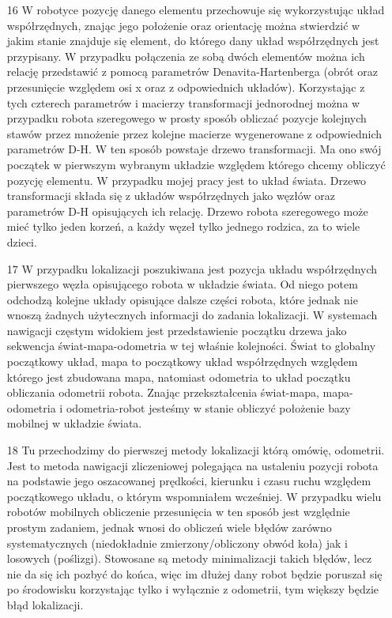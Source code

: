 \documentclass[10pt,a4paper]{article}
\begin{document}
\begin{itemize}
		\item[16]
	W robotyce pozycję danego elementu przechowuje się wykorzystując układ współrzędnych, znając jego położenie oraz orientację można stwierdzić w jakim stanie znajduje się element, do którego dany układ współrzędnych jest przypisany.
W przypadku połączenia ze sobą dwóch elementów można ich relację przedstawić z pomocą parametrów Denavita-Hartenberga (obrót oraz przesunięcie względem osi x oraz z odpowiednich układów). 
Korzystając z tych czterech parametrów i macierzy transformacji jednorodnej można w przypadku robota szeregowego w prosty sposób obliczać pozycje kolejnych stawów przez mnożenie przez kolejne macierze wygenerowane z odpowiednich parametrów D-H.
W ten sposób powstaje drzewo transformacji. Ma ono swój początek w pierwszym wybranym układzie względem którego chcemy obliczyć pozycję elementu.
W przypadku mojej pracy jest to układ świata.
Drzewo transformacji składa się z układów współrzędnych jako węzłów oraz parametrów D-H opisujących ich relację. 
Drzewo robota szeregowego może mieć tylko jeden korzeń, a każdy węzeł tylko jednego rodzica, za to wiele dzieci.
		\item[17]
	W przypadku lokalizacji poszukiwana jest pozycja układu współrzędnych pierwszego węzła opisującego robota w układzie świata. 
Od niego potem odchodzą kolejne układy opisujące dalsze części robota, które jednak nie wnoszą żadnych użytecznych informacji do zadania lokalizacji.
W systemach nawigacji częstym widokiem jest przedstawienie początku drzewa jako sekwencja świat-mapa-odometria w tej właśnie kolejności. 
Świat to globalny początkowy układ, mapa to początkowy układ współrzędnych względem którego jest zbudowana mapa, natomiast odometria to układ początku obliczania odometrii robota.
Znając przekształcenia świat-mapa, mapa-odometria i odometria-robot jesteśmy w stanie obliczyć położenie bazy mobilnej w układzie świata.
\pagebreak
		\item[18]
    Tu przechodzimy do pierwszej metody lokalizacji którą omówię, odometrii.
Jest to metoda nawigacji zliczeniowej polegająca na ustaleniu pozycji robota na podstawie jego oszacowanej prędkości, kierunku i czasu ruchu względem początkowego układu, o którym wspomniałem wcześniej.
W przypadku wielu robotów mobilnych obliczenie przesunięcia w ten sposób jest względnie prostym zadaniem, jednak wnosi do obliczeń wiele błędów zarówno systematycznych (niedokładnie zmierzony/obliczony obwód koła) jak i losowych (poślizgi). 
Stowosane są metody minimalizacji takich błędów, lecz nie da się ich pozbyć do końca, więc im dłużej dany robot będzie poruszał się po środowisku korzystając tylko i wyłącznie z odometrii, tym większy będzie błąd lokalizacji.

\end{itemize}
\end{document}

